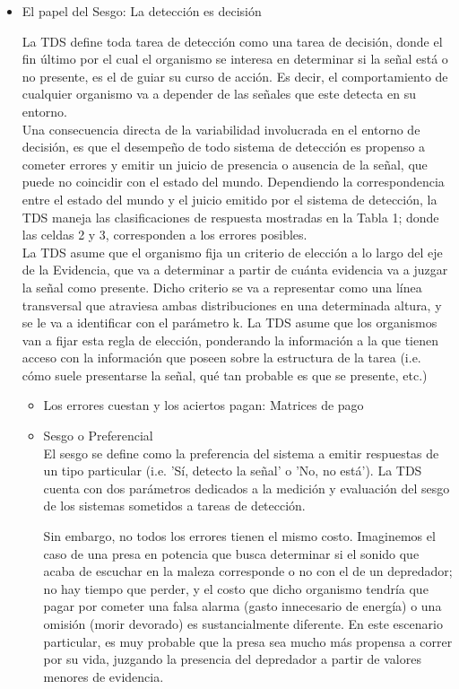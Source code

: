 \begin{itemize}
  \item{El papel del Sesgo: La detección es decisión}

La TDS define toda tarea de detección como una tarea de decisión, donde el fin último por el cual el organismo se interesa en determinar si la señal está o no presente, es el de guiar su curso de acción. Es decir, el comportamiento de cualquier organismo va a depender de las señales que este detecta en su entorno.\\

Una consecuencia directa de la variabilidad involucrada en el entorno de decisión, es que el desempeño de todo sistema de detección es propenso a cometer errores y emitir un juicio de presencia o ausencia de la señal, que puede no coincidir con el estado del mundo. Dependiendo la correspondencia entre el estado del mundo y el juicio emitido por el sistema de detección, la TDS maneja las clasificaciones de respuesta mostradas en la Tabla 1; donde las celdas 2 y 3, corresponden a los errores posibles.\\

La TDS asume que el organismo fija un criterio de elección a lo largo del eje de la Evidencia, que va a determinar a partir de cuánta evidencia va a juzgar la señal como presente. Dicho criterio se va a representar como una línea transversal que atraviesa ambas distribuciones en una determinada altura, y se le va a identificar con el parámetro k. La TDS asume que los organismos van a fijar esta regla de elección, ponderando la información a la que tienen acceso con la información que poseen sobre la estructura de la tarea (i.e. cómo suele presentarse la señal, qué tan probable es que se presente, etc.)\\

    \begin{itemize}
      \item{Los errores cuestan y los aciertos pagan: Matrices de pago}\\

      \item{Sesgo o Preferencial}\\

  El sesgo se define como la preferencia del sistema a emitir respuestas de un tipo particular (i.e. 'Sí, detecto la señal' o 'No, no está'). La TDS cuenta con dos parámetros dedicados a la medición y evaluación del sesgo de los sistemas sometidos a tareas de detección.

 Sin embargo, no todos los errores tienen el mismo costo. Imaginemos el caso de una presa en potencia que busca determinar si el sonido que acaba de escuchar en la maleza corresponde o no con el de un depredador; no hay tiempo que perder, y el costo que dicho organismo tendría que pagar por cometer una falsa alarma (gasto innecesario de energía) o una omisión (morir devorado) es sustancialmente diferente. En este escenario particular, es muy probable que la presa sea mucho más propensa a correr por su vida, juzgando la presencia del depredador a partir de valores menores de evidencia.\\


\end{itemize}
\end{itemize}
